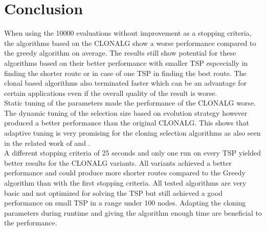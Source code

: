 \chapter{Conclusion}
\label{chap:con}
When using the 10000 evaluations without improvement as a stopping criteria, the algorithms based on the CLONALG show a worse performance compared to the greedy algorithm on average. The results still show potential for these algorithms based on their better performance with smaller TSP espcecially in finding the shorter route or in case of one TSP in finding the best route. The clonal based algorithms also terminated faster which can be an advantage for certain applications even if the overall quality of the result is worse.\\
Static tuning of the parameters made the performance of the CLONALG worse. The dynamic tuning of the selection size based on evolution strategy however produced a better performance than the original CLONALG. This shows that adaptive tuning is very promising for the cloning selection algorithms as also seen in the related work of \cite{Garret04} and \Cite{RIFF09}.\\
A different stopping criteria of 25 seconds and only one run on every TSP yielded better results for the CLONALG variants. All variants achieved a better performance and could produce more shorter routes compared to the Greedy algorithm than with the first stopping criteria. All tested algorithms are very basic and not optimized for solving the TSP but still achieved a good performance on small TSP in a range under 100 nodes. Adapting the cloning parameters during runtime and giving the algorithm enough time are beneficial to the performance.
